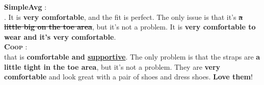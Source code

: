\documentclass[11pt]{article}
\newcommand{\aggname}{\textsc{Coop}}
\newcommand{\name}{\mbox{\sc BiMeanVAE}}
\newcommand{\simpleavg}{\mbox{SimpleAvg}}
\newcommand{\amazon}{\mbox{\bf Amazon}}
\newcommand\two[1]{\textcolor{c2}{\textbf{#1}}}
\newcommand\three[1]{\textcolor{c3}{\textbf{#1}}}
\newcommand\four[1]{\textcolor{c4}{\textbf{#1}}}
\begin{document}
\begin{figure*}[th]
\begin{mdframed}
        

        \textbf{SimpleAvg} :\\
        . It is \two{very comfortable}, and the fit is perfect. The only issue is that it's {\color{red}\bf\sout{a little big on the toe area}}, but it's not a problem. It is \two{very comfortable to wear and it's very comfortable}.\\
        
        \textbf{\aggname{}} :\\
         that is \two{comfortable and \underline{supportive}}. The only problem is that the straps are \three{a little tight in the toe area}, but it's not a problem. They are \two{very comfortable} and look great with a pair of shoes and dress shoes. \four{Love them}!\\
        \end{mdframed}
    \caption{Example of summaries generated by \name{} with \simpleavg{} and \aggname{} for reviews about a product on the \amazon{} dataset.
    The colors denote the corresponding opinions, and struck-through reviews in gray were not selected by \aggname{} for summary generation (Note that \simpleavg{} uses all the input reviews.) Terms that are more specific to the entity are underlined. Red and struck-through text denotes hallucinated content that has the opposite meaning compared to the input.}
    \label{fig:example-amazon}
\end{figure*}
\end{document}
